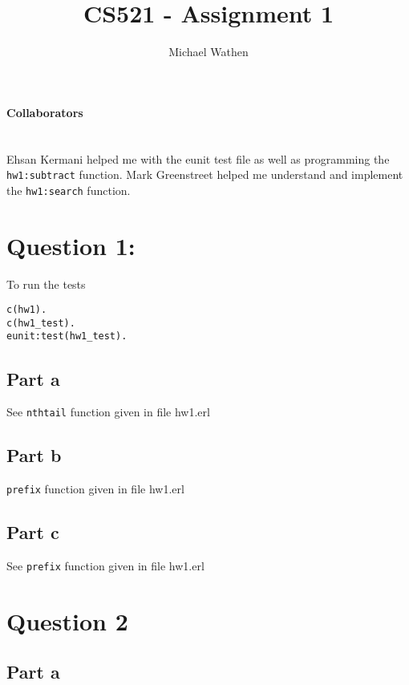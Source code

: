 \documentclass{article}
\begin{document}
\title{CS521 - Assignment 1}
\author{Michael Wathen}
\maketitle

\paragraph{Collaborators} ~\\
Ehsan Kermani helped me with the eunit test file as well as programming the  {\tt{hw1:subtract}} function. Mark Greenstreet helped me understand and implement the {\tt{hw1:search}} function.



\vspace{1cm}


\section*{Question 1:}

To run the tests
\begin{lstlisting}
c(hw1).
c(hw1_test).
eunit:test(hw1_test).
\end{lstlisting}
\subsection*{Part a}

See {\tt nthtail} function given in file hw1.erl



\subsection*{Part b}

{\tt prefix} function given in file hw1.erl


\subsection*{Part c}



See {\tt prefix} function given in file hw1.erl


\section*{Question 2}

\subsection*{Part a}
\end{document}
